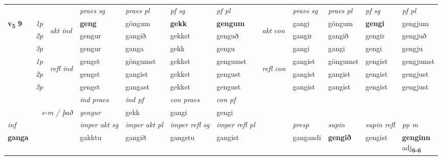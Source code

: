 \begin{longtable}[l]{X>{\footnotesize\itshape}llXXXXlXXXX}
\midrule
 & &   & \textit{praes sg}  & \textit{praes pl}    & \textit{ pf sg} & \textit{pf pl} & & \textit{praes sg}  & \textit{praes pl}    & \textit{pf sg} & \textit{pf pl }  \\ \cmidrule{4-7} \cmidrule{9-12}
 \multirow{2}{*}{{{\textbf{v{\textsubscript{5}}} \Large{\textbf{9}}}}}  & 1p & \multirow{3}{*}{\begin{turn}{90}\textit{akt ind}\end{turn}} & \textbf{geng} & göngum & \textbf{gekk} & \textbf{gengum} & \multirow{3}{*}{\begin{turn}{90}\textit{akt con}\end{turn}} &gangi & göngum & \textbf{gengi} & gengjum\\*
 & 2p &  &  gengur  & gangið & gekkst & genguð & & gangir & gangið & gengir & gengjuð \\*
 & 3p &  & gengur & ganga & gekk & gengu & & gangi & gangi& gengi & gengju \\*
\cmidrule{4-7} \cmidrule{9-12}
 & 1p & \multirow{3}{*}{\begin{turn}{90}\textit{refl ind}\end{turn}}  & gengst & göngumst & gekkst & gengumst & \multirow{3}{*}{\begin{turn}{90}\textit{refl con}\end{turn}}  &gangist & göngumst & gengist & gengjumst \\*
 & 2p &  & gengst & gangist & gekkst & gengust & &gangist & gangist & gengist & gengjust \\*
 & 3p  & & gengst & gangast & gekkst & gengust & & gangist & gangist& gengist & gengjust \\*
\cmidrule{4-7} \cmidrule{9-12}

   && &  \textit{ind praes} & \textit{ind pf} & \textit{con praes} & \textit{con pf} \\*
\multicolumn{3}{r}{\textit{e-m / það}} & gengur & gekk & gangi & gengi \\*

\cmidrule{4-7}
   {\textit{inf}} & &  & \textit{imper akt sg} & \textit{imper akt pl} & \textit{imper refl sg} & \textit{imper refl pl} && \textit{presp} & \textit{supin} & \textit{supin refl} & \textit{pp m} \\*
  {\textbf{ganga}} & && gakktu  & gangið & gangstu & gangist && gangandi &  \textbf{gengið} & gengist & \specialcell{\textbf{genginn} \\ adj\textbf{\textsubscript{6-6}}} \\*


\end{longtable}
